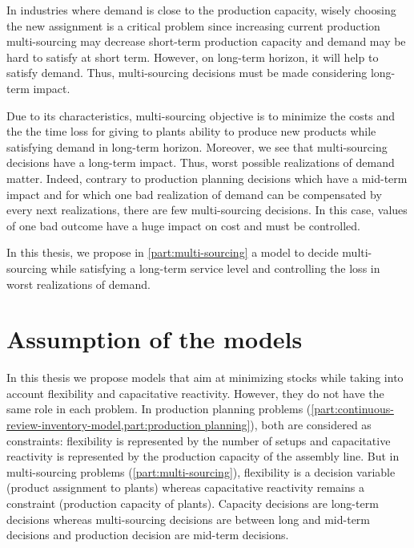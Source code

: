 In industries where demand is close to the production capacity, wisely choosing the new assignment is a critical problem since increasing current production multi-sourcing may decrease short-term production capacity and demand may be hard to satisfy at short term.
However, on long-term horizon, it will help to satisfy demand.
Thus, multi-sourcing decisions must be made considering long-term impact.


Due to its characteristics, multi-sourcing objective is to minimize the costs and the the time loss for giving to plants ability to produce new products while satisfying demand in long-term horizon.
Moreover, we see that multi-sourcing decisions have a long-term impact.
Thus, worst possible realizations of demand matter.
Indeed, contrary to production planning decisions which have a mid-term impact and for which one bad realization of demand can be compensated by every next realizations, there are few multi-sourcing decisions.
In this case, values of one bad outcome have a huge impact on cost and must be controlled.


\medskip


In this thesis, we propose in \cref{part:multi-sourcing} a model to decide multi-sourcing while satisfying a long-term service level and controlling the loss in worst realizations of demand.



\section{Assumption of the models}




In this thesis we propose models that aim at minimizing stocks while taking into account flexibility and capacitative reactivity.
However, they do not have the same role in each problem.
In production planning problems (\cref{part:continuous-review-inventory-model,part:production planning}), both are considered as constraints: flexibility is represented by the number of setups and capacitative reactivity is represented by the production capacity of the assembly line.
But in multi-sourcing problems (\cref{part:multi-sourcing}), flexibility is a decision variable (product assignment to plants) whereas capacitative reactivity remains a constraint (production capacity of plants).
Capacity decisions are long-term decisions whereas multi-sourcing decisions are between long and mid-term decisions and production decision are mid-term decisions.


